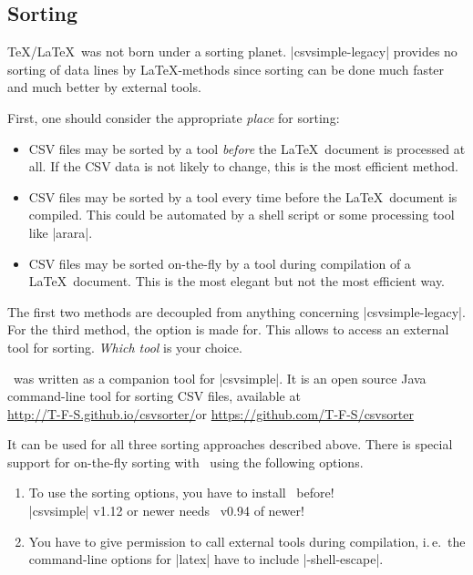 \documentclass[a4paper,11pt]{ltxdoc}
\begin{document}
\clearpage
\subsection{Sorting}\label{sec:Sorting}%
\TeX/\LaTeX\ was not born under a sorting planet. |csvsimple-legacy| provides no
sorting of data lines by \LaTeX-methods since sorting can be done much faster
and much better by external tools.

First, one should consider the appropriate \emph{place} for sorting:
\begin{itemize}
\item CSV files may be sorted by a tool \emph{before} the \LaTeX\ document is processed
  at all. If the CSV data is not likely to change, this is the most efficient method.
\item CSV files may be sorted by a tool every time before the \LaTeX\ document is compiled.
  This could be automated by a shell script or some processing tool like |arara|.
\item CSV files may be sorted on-the-fly by a tool during compilation of
  a \LaTeX\ document. This is the most elegant but not the most efficient way.
\end{itemize}

The first two methods are decoupled from anything concerning |csvsimple-legacy|.
For the third method, the  option is made for.
This allows to access an external tool for sorting.
\emph{Which tool} is your choice.

\csvsorter\ was written as a companion tool for |csvsimple|.
It is an open source Java command-line tool for sorting CSV files, available at\\
\url{http://T-F-S.github.io/csvsorter/}\quad or\quad
\url{https://github.com/T-F-S/csvsorter}

It can be
used for all three sorting approaches described above.
There is special support for on-the-fly sorting with \csvsorter\ using the
following options.

\begin{enumerate}\bfseries
\item To use the sorting options, you have to install \csvsorter\ before!\\
  |csvsimple| v1.12 or newer needs \csvsorter\ v0.94 of newer!
\item You have to give permission to call external tools during
  compilation, i.\,e.\ the command-line options for |latex| have to include
  |-shell-escape|.
\end{enumerate}
\end{document}
